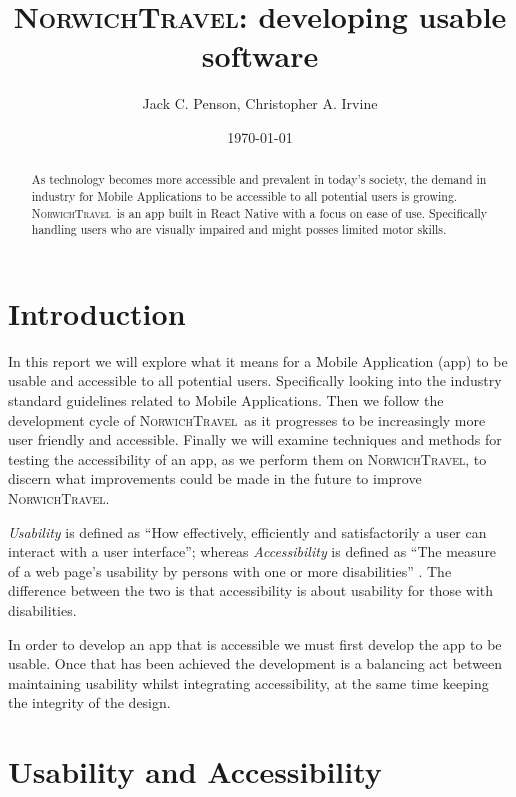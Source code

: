 \documentclass[cmpstyle]{ueacmpstyle}
\newcommand{\nt}{\textsc{NorwichTravel}}
\begin{document}
	\title{\textsc{NorwichTravel}: developing usable software}
	\author{Jack C. Penson, Christopher A. Irvine}
	\date{\today}
	\maketitle
	\begin{abstract}
		As technology becomes more accessible and prevalent in today's society, the demand in industry for Mobile Applications to be accessible to all potential users is growing. \nt \ is an app built in React Native with a focus on ease of use. Specifically handling users who are visually impaired and might posses limited motor skills. %
	\end{abstract}
	\section{Introduction}
	In this report we will explore what it means for a Mobile Application (app) to be usable and accessible to all potential users. Specifically looking into the industry standard guidelines related to Mobile Applications. Then we follow the development cycle of \nt \ as it progresses to be increasingly more user friendly and accessible. Finally we will examine techniques and methods for testing the accessibility of an app, as we perform them on \nt, to discern what improvements could be made in the future to improve \nt.
	
	\textit{Usability} is defined as ``How effectively, efficiently and satisfactorily a user can interact with a user interface''; whereas \textit{Accessibility} is defined as ``The measure of a web page's usability by persons with one or more disabilities'' \citep{usability}. The difference between the two is that accessibility is about usability for those with disabilities.
	
	In order to develop an app that is accessible we must first develop the app to be usable. Once that has been achieved the development is a balancing act between maintaining usability whilst integrating accessibility, at the same time keeping the integrity of the design.
	
	\section{Usability and Accessibility}
	
\end{document}
